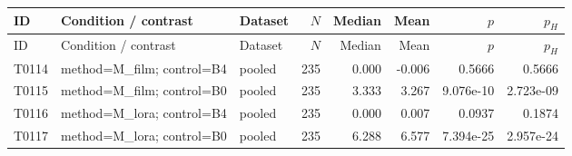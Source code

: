 \begin{longtable}{p{.45in}p{2.6in}p{.75in}rrrrr}
\toprule
ID & Condition / contrast & Dataset & $N$ & Median & Mean & $p$ & $p_H$ \\
\midrule
\endfirsthead
\toprule
ID & Condition / contrast & Dataset & $N$ & Median & Mean & $p$ & $p_H$ \\
\midrule
\endhead
T0114 & method=M\_\allowbreak{}film; control=B4 & pooled & 235 & 0.000 & -0.006 & 0.5666 & 0.5666 \\
T0115 & method=M\_\allowbreak{}film; control=B0 & pooled & 235 & 3.333 & 3.267 & 9.076e-10 & 2.723e-09 \\
T0116 & method=M\_\allowbreak{}lora; control=B4 & pooled & 235 & 0.000 & 0.007 & 0.0937 & 0.1874 \\
T0117 & method=M\_\allowbreak{}lora; control=B0 & pooled & 235 & 6.288 & 6.577 & 7.394e-25 & 2.957e-24 \\
\bottomrule
\end{longtable}
